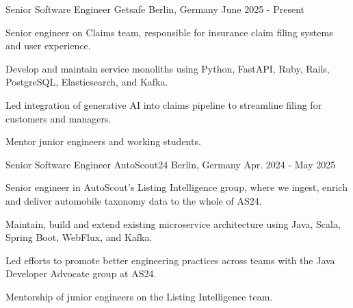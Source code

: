 
\begin{cventries}

  \cventry
    {Senior Software Engineer} %
    {Getsafe} %
    {Berlin, Germany} %
    {June 2025 - Present} %
    {
      \begin{cvitems} %
        \item {Senior engineer on Claims team, responsible for insurance claim filing systems and user experience.}
        \item {Develop and maintain service monoliths using Python, FastAPI, Ruby, Rails, PostgreSQL, Elasticsearch, and Kafka.}
        \item {Led integration of generative AI into claims pipeline to streamline filing for customers and managers.}
        \item {Mentor junior engineers and working students.}
      \end{cvitems}
    }

  \cventry
    {Senior Software Engineer} %
    {AutoScout24} %
    {Berlin, Germany} %
    {Apr. 2024 - May 2025} %
    {
      \begin{cvitems} %
        \item {Senior engineer in AutoScout's Listing Intelligence group, where we ingest, enrich and deliver automobile taxonomy data to the whole of AS24.}
        \item {Maintain, build and extend existing microservice architecture using Java, Scala, Spring Boot, WebFlux, and Kafka.}
        \item {Led efforts to promote better engineering practices across teams with the Java Developer Advocate group at AS24.}
        \item {Mentorship of junior engineers on the Listing Intelligence team.}
      \end{cvitems}
    }


\end{cventries}
